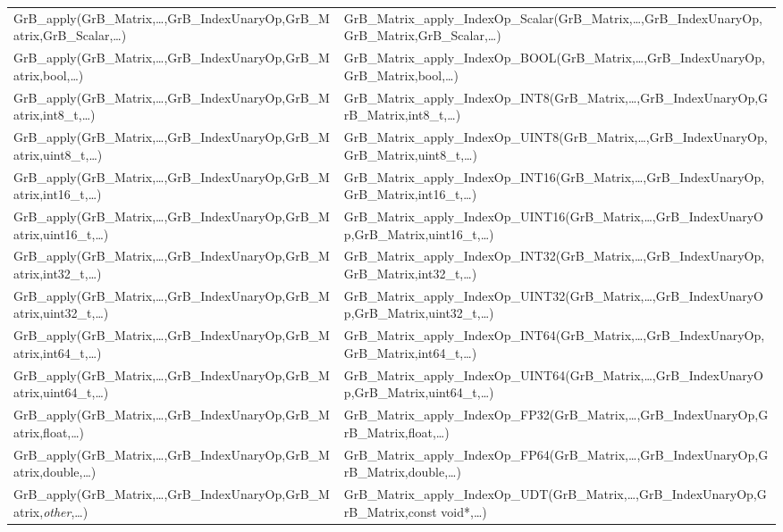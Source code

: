 \begin{landscape}
\begin{table}[htb]
{\begin{tabular}{l|l}
{\sf GrB\_apply(GrB\_Matrix,\ldots,GrB\_IndexUnaryOp,GrB\_Matrix,GrB\_Scalar,\ldots)}		& {\sf GrB\_Matrix\_apply\_IndexOp\_Scalar(GrB\_Matrix,\ldots,GrB\_IndexUnaryOp,GrB\_Matrix,GrB\_Scalar,\ldots)} \\
{\sf GrB\_apply(GrB\_Matrix,\ldots,GrB\_IndexUnaryOp,GrB\_Matrix,bool,\ldots)}		    & {\sf GrB\_Matrix\_apply\_IndexOp\_BOOL(GrB\_Matrix,\ldots,GrB\_IndexUnaryOp,GrB\_Matrix,bool,\ldots)} \\
{\sf GrB\_apply(GrB\_Matrix,\ldots,GrB\_IndexUnaryOp,GrB\_Matrix,int8\_t,\ldots)}	    & {\sf GrB\_Matrix\_apply\_IndexOp\_INT8(GrB\_Matrix,\ldots,GrB\_IndexUnaryOp,GrB\_Matrix,int8\_t,\ldots)} \\
{\sf GrB\_apply(GrB\_Matrix,\ldots,GrB\_IndexUnaryOp,GrB\_Matrix,uint8\_t,\ldots)}	    & {\sf GrB\_Matrix\_apply\_IndexOp\_UINT8(GrB\_Matrix,\ldots,GrB\_IndexUnaryOp,GrB\_Matrix,uint8\_t,\ldots)} \\
{\sf GrB\_apply(GrB\_Matrix,\ldots,GrB\_IndexUnaryOp,GrB\_Matrix,int16\_t,\ldots)}	    & {\sf GrB\_Matrix\_apply\_IndexOp\_INT16(GrB\_Matrix,\ldots,GrB\_IndexUnaryOp,GrB\_Matrix,int16\_t,\ldots)} \\
{\sf GrB\_apply(GrB\_Matrix,\ldots,GrB\_IndexUnaryOp,GrB\_Matrix,uint16\_t,\ldots)}	& {\sf GrB\_Matrix\_apply\_IndexOp\_UINT16(GrB\_Matrix,\ldots,GrB\_IndexUnaryOp,GrB\_Matrix,uint16\_t,\ldots)} \\
{\sf GrB\_apply(GrB\_Matrix,\ldots,GrB\_IndexUnaryOp,GrB\_Matrix,int32\_t,\ldots)}	    & {\sf GrB\_Matrix\_apply\_IndexOp\_INT32(GrB\_Matrix,\ldots,GrB\_IndexUnaryOp,GrB\_Matrix,int32\_t,\ldots)} \\
{\sf GrB\_apply(GrB\_Matrix,\ldots,GrB\_IndexUnaryOp,GrB\_Matrix,uint32\_t,\ldots)}	& {\sf GrB\_Matrix\_apply\_IndexOp\_UINT32(GrB\_Matrix,\ldots,GrB\_IndexUnaryOp,GrB\_Matrix,uint32\_t,\ldots)} \\
{\sf GrB\_apply(GrB\_Matrix,\ldots,GrB\_IndexUnaryOp,GrB\_Matrix,int64\_t,\ldots)}	    & {\sf GrB\_Matrix\_apply\_IndexOp\_INT64(GrB\_Matrix,\ldots,GrB\_IndexUnaryOp,GrB\_Matrix,int64\_t,\ldots)} \\
{\sf GrB\_apply(GrB\_Matrix,\ldots,GrB\_IndexUnaryOp,GrB\_Matrix,uint64\_t,\ldots)}	& {\sf GrB\_Matrix\_apply\_IndexOp\_UINT64(GrB\_Matrix,\ldots,GrB\_IndexUnaryOp,GrB\_Matrix,uint64\_t,\ldots)} \\
{\sf GrB\_apply(GrB\_Matrix,\ldots,GrB\_IndexUnaryOp,GrB\_Matrix,float,\ldots)}		& {\sf GrB\_Matrix\_apply\_IndexOp\_FP32(GrB\_Matrix,\ldots,GrB\_IndexUnaryOp,GrB\_Matrix,float,\ldots)} \\
{\sf GrB\_apply(GrB\_Matrix,\ldots,GrB\_IndexUnaryOp,GrB\_Matrix,double,\ldots)}	    & {\sf GrB\_Matrix\_apply\_IndexOp\_FP64(GrB\_Matrix,\ldots,GrB\_IndexUnaryOp,GrB\_Matrix,double,\ldots)} \\
{\sf GrB\_apply(GrB\_Matrix,\ldots,GrB\_IndexUnaryOp,GrB\_Matrix,\emph{other},\ldots)}	& {\sf GrB\_Matrix\_apply\_IndexOp\_UDT(GrB\_Matrix,\ldots,GrB\_IndexUnaryOp,GrB\_Matrix,const void*,\ldots)} \\
\hline
\end{tabular}
}
\label{Tab:NonPolymorphic5b1}
\end{table}



\end{landscape}
